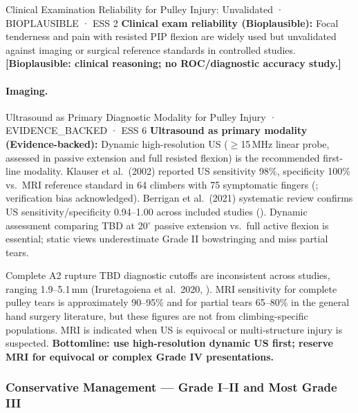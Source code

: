 \begin{bioplausbox}{Clinical Examination Reliability for Pulley Injury: Unvalidated · BIOPLAUSIBLE · ESS 2}
\textbf{Clinical exam reliability (Bioplausible):} Focal tenderness and pain with resisted PIP flexion are widely used but unvalidated against imaging or surgical reference standards in controlled studies. \textbf{[Bioplausible: clinical reasoning; no ROC/diagnostic accuracy study.]}
\end{bioplausbox}

\paragraph{Imaging.}\leavevmode

\begin{evidencebox}{Ultrasound as Primary Diagnostic Modality for Pulley Injury · EVIDENCE\_BACKED · ESS 6}
\textbf{Ultrasound as primary modality (Evidence-backed):} Dynamic high-resolution US ($\geq$15\,MHz linear probe, assessed in passive extension and full resisted flexion) is the recommended first-line modality. Klauser et al.\ (2002) reported US sensitivity 98\%, specificity 100\% vs.\ MRI reference standard in 64 climbers with 75 symptomatic fingers (\cite{KFBE02}; verification bias acknowledged). Berrigan et al.\ (2021) systematic review confirms US sensitivity/specificity 0.94--1.00 across included studies (\cite{BWCE21}). Dynamic assessment comparing TBD at 20$^\circ$ passive extension vs.\ full active flexion is essential; static views underestimate Grade II bowstringing and miss partial tears.

Complete A2 rupture TBD diagnostic cutoffs are inconsistent across studies, ranging 1.9--5.1\,mm (Iruretagoiena et al.\ 2020, \cite{IDRE20}). MRI sensitivity for complete pulley tears is approximately 90--95\% and for partial tears 65--80\% in the general hand surgery literature, but these figures are not from climbing-specific populations. MRI is indicated when US is equivocal or multi-structure injury is suspected. \textbf{Bottomline: use high-resolution dynamic US first; reserve MRI for equivocal or complex Grade IV presentations.}
\end{evidencebox}

\subsubsection{Conservative Management --- Grade I--II and Most Grade III}

